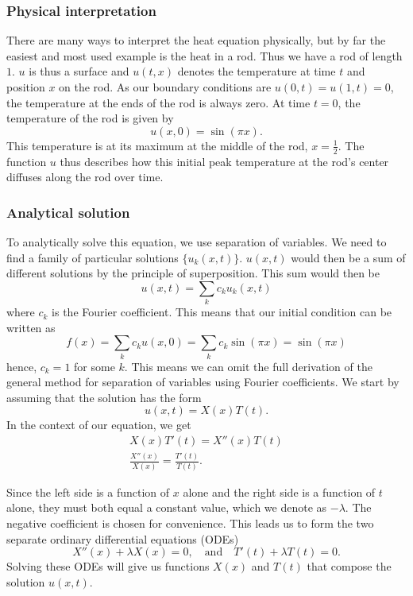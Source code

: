 \documentclass{article}
\theoremstyle{definition}
\begin{document}
\subsubsection{Physical interpretation}
There are many ways to interpret the heat equation physically, but by far the easiest and most used example is the heat in a rod. Thus we have a rod of length $1$. $u$ is thus a surface and $u(t,x)$ denotes the temperature at time $t$ and position $x$ on the rod. As our boundary conditions are $u(0,t) = u(1,t) = 0$, the temperature at the ends of the rod is always zero. At time $t = 0$, the temperature of the rod is given by
\begin{equation*}
    u(x,0) = \sin(\pi x).
\end{equation*}
This temperature is at its maximum at the middle of the rod, $x=\tfrac{1}{2}$. The function $u$ thus describes how this initial peak temperature at the rod's center diffuses along the rod over time.

\subsubsection{Analytical solution}
To analytically solve this equation, we use separation of variables. We need to find a family of particular solutions $\{u_k(x,t)\}$. $u(x,t)$ would then be a sum of different solutions by the principle of superposition. This sum would then be
\begin{equation*}
    u(x,t) = \sum_{k}c_ku_k(x,t)
\end{equation*}
where $c_k$ is the Fourier coefficient. This means that our initial condition can be written as
\begin{equation*}
    f(x) = \sum_{k}c_ku(x,0) = \sum_k c_k\sin(\pi x) = \sin(\pi x)
\end{equation*}
hence, $c_k = 1$ for some $k$. This means we can omit the full derivation of the general method for separation of variables using Fourier coefficients. 
We start by assuming that the solution has the form
\begin{equation*}
    u(x,t) = X(x)T(t).
\end{equation*}
In the context of our equation, we get
\begin{gather*}
    X(x) T'(t) = X''(x) T(t) \\
    \frac{X''(x)}{X(x)} = \frac{T'(t)}{T(t)}. 
\end{gather*}

Since the left side is a function of $x$ alone and the right side is a function of $t$ alone, they must both equal a constant value, which we denote as $-\lambda$. The negative coefficient is chosen for convenience. This leads us to form the two separate ordinary differential equations (ODEs)
\begin{equation*}
    X''(x) + \lambda X(x) = 0,\quad \text{and} \quad T'(t) + \lambda T(t) = 0. 
\end{equation*}
Solving these ODEs will give us functions $X(x)$ and $T(t)$ that compose the solution $u(x,t)$.
\end{document}
